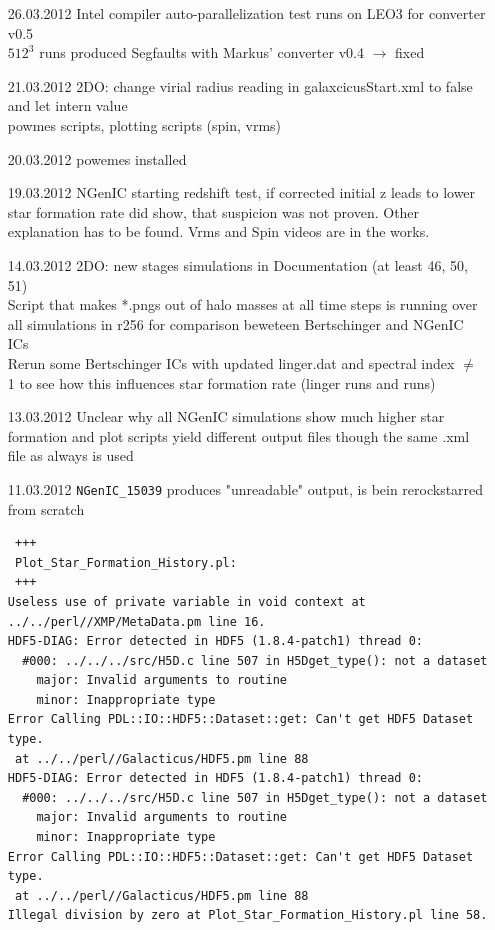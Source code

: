 \documentclass[a4paper,11pt,fleqn,oneside]{book}
\begin{document}
\begin{itemize}
\item[26.03.2012] 
Intel compiler auto-parallelization test runs on LEO3 
for converter v0.5 \\
$512^3$ runs produced Segfaults with Markus' converter 
v0.4 $\rightarrow$ fixed \\

\item[21.03.2012]
2DO: change virial radius reading in galaxcicusStart.xml 
to false and let intern value \\
powmes scripts, plotting scripts (spin, vrms) \\

\item[20.03.2012]
powemes installed 

\item[19.03.2012]
NGenIC starting redshift test, if corrected initial z leads to 
lower star formation rate did show, that suspicion was not 
proven. Other explanation has to be found. Vrms and Spin videos are 
in the works. 

\item[14.03.2012]
2DO: new stages simulations in Documentation 
(at least 46, 50, 51) \\
Script that makes *.pngs out of halo masses at all 
time steps is running over all simulations in r256  for 
comparison beweteen Bertschinger and NGenIC ICs \\
Rerun some Bertschinger ICs with updated linger.dat and 
spectral index $\neq$ 1 to see how this influences 
star formation rate (linger runs and runs) \\


\item[13.03.2012]
Unclear why all NGenIC simulations show much higher 
star formation and plot scripts yield different 
output files though the same .xml file as always 
is used 

\item[11.03.2012]
\texttt{NGenIC\_15039} produces "unreadable" output, 
is bein rerockstarred from scratch 
\begin{verbatim}
 +++ 
 Plot_Star_Formation_History.pl:
 +++ 
Useless use of private variable in void context at ../../perl//XMP/MetaData.pm line 16.
HDF5-DIAG: Error detected in HDF5 (1.8.4-patch1) thread 0:
  #000: ../../../src/H5D.c line 507 in H5Dget_type(): not a dataset
    major: Invalid arguments to routine
    minor: Inappropriate type
Error Calling PDL::IO::HDF5::Dataset::get: Can't get HDF5 Dataset type.
 at ../../perl//Galacticus/HDF5.pm line 88
HDF5-DIAG: Error detected in HDF5 (1.8.4-patch1) thread 0:
  #000: ../../../src/H5D.c line 507 in H5Dget_type(): not a dataset
    major: Invalid arguments to routine
    minor: Inappropriate type
Error Calling PDL::IO::HDF5::Dataset::get: Can't get HDF5 Dataset type.
 at ../../perl//Galacticus/HDF5.pm line 88
Illegal division by zero at Plot_Star_Formation_History.pl line 58.
\end{verbatim}


\end{itemize}
\end{document}
